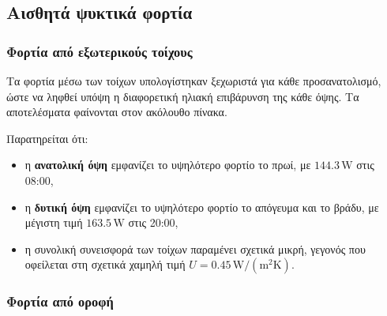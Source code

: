 \documentclass[12pt,a4paper]{article}
\begin{document}
\subsection{Αισθητά ψυκτικά φορτία}

\subsubsection{Φορτία από εξωτερικούς τοίχους}

Τα φορτία μέσω των τοίχων υπολογίστηκαν ξεχωριστά για κάθε προσανατολισμό, ώστε να
ληφθεί υπόψη η διαφορετική ηλιακή επιβάρυνση της κάθε όψης. Τα αποτελέσματα
φαίνονται στον ακόλουθο πίνακα.

\begin{table}[H]
\centering
\caption{Αισθητά φορτία από εξωτερικούς τοίχους}
\end{table}

Παρατηρείται ότι:

\begin{itemize}
\item η \textbf{ανατολική όψη} εμφανίζει το υψηλότερο φορτίο το πρωί, με
\(144.3\,\mathrm{W}\) στις 08:00,
\item η \textbf{δυτική όψη} εμφανίζει το υψηλότερο φορτίο το απόγευμα και το βράδυ,
με μέγιστη τιμή \(163.5\,\mathrm{W}\) στις 20:00,
\item η συνολική συνεισφορά των τοίχων παραμένει σχετικά μικρή, γεγονός που
οφείλεται στη σχετικά χαμηλή τιμή \(U = 0.45\,\mathrm{W/(m^2K)}\).
\end{itemize}

\subsubsection{Φορτία από οροφή}
\end{document}
